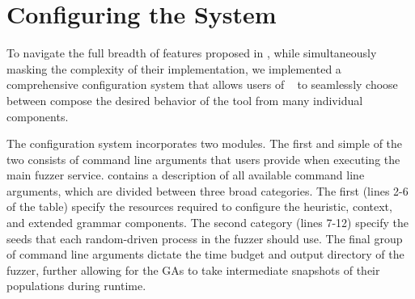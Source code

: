 \section{\label{sec:configuration}Configuring the System}

To navigate the full breadth of features proposed in ,
while simultaneously masking the complexity of their implementation,
we implemented a comprehensive configuration system that allows
users of \kf~ to seamlessly choose between compose the desired behavior
of the tool from many individual components.

The configuration system incorporates two modules.
The first and simple of the two consists of command line arguments that
users provide when executing the main fuzzer service.
 contains a description of all available command line arguments,
which are divided between three broad categories.
The first (lines 2-6 of the table) specify the resources
required to configure the heuristic, context, and extended grammar components.
The second category (lines 7-12) specify the seeds that each 
random-driven process in the fuzzer should use.
The final group of command line arguments
dictate the time budget and output directory of the fuzzer,
further allowing for the \gls{GA}s to take intermediate snapshots
of their populations during runtime.

